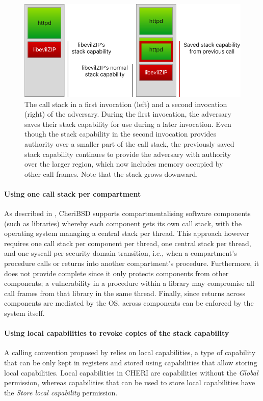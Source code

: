 \documentclass[main.tex]{subfiles}
\begin{document}
\begin{figure}
	\begin{center}
		\includegraphics{Images/Saved Stack Cap.pdf}
	\end{center}
	\caption{The call stack in a first invocation (left) and a second invocation (right) of the adversary. During the first invocation, the adversary saves their stack capability for use during a later invocation. Even though the stack capability in the second invocation provides authority over a smaller part of the call stack, the previously saved stack capability continues to provide the adversary with authority over the larger region, which now includes memory occupied by other call frames. Note that the stack grows downward.}
	\label{fig:savedstackcap}
\end{figure}

\paragraph{Using one call stack per compartment} As described in \cite{compartment}, CheriBSD supports compartmentalising software components (such as libraries) whereby each component gets its own call stack, with the operating system managing a central stack per thread. This approach however requires one call stack per component per thread, one central stack per thread, and one syscall per security domain transition, i.e., when a compartment's procedure calls or returns into another compartment's procedure. Furthermore, it does not provide complete  since it only protects components from other components; a vulnerability in a procedure within a library may compromise all call frames from that library in the same thread. Finally, since returns across components are mediated by the OS,  across components can be enforced by the system itself.

\paragraph{Using local capabilities to revoke copies of the stack capability} A calling convention proposed by \cite{retptr} relies on local capabilities, a type of capability that can be only kept in registers and stored using capabilities that allow storing local capabilities. Local capabilities in CHERI are capabilities without the \emph{Global} permission, whereas capabilities that can be used to store local capabilities have the \emph{Store local capability} permission.
\end{document}
